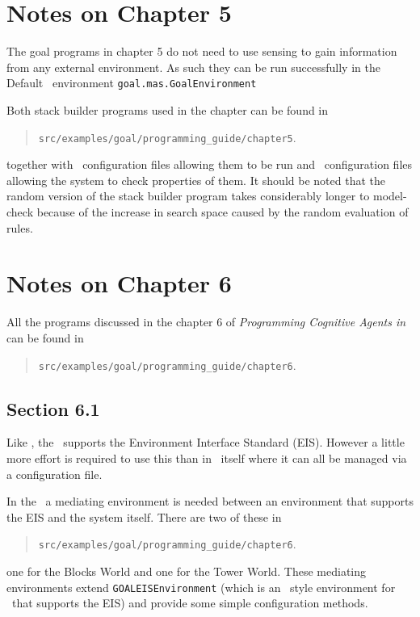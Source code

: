 \section{Notes on Chapter 5}
The goal programs in chapter 5 do not need to use sensing to gain information from any external environment.  As such they can be run successfully in the Default \goal\ environment \texttt{goal.mas.GoalEnvironment}

Both stack builder programs used in the chapter can be found in
\begin{quote}
  \texttt{src/examples/goal/programming\_guide/chapter5}.
\end{quote}
together with \ail\ configuration files allowing them to be run and \ajpf\ configuration files allowing the system to check properties of them.  It should be noted that the random version of the stack builder program takes considerably longer to model-check because of the increase in search space caused by the random evaluation of rules.

\section{Notes on Chapter 6}

All the programs discussed in the chapter 6 of \emph{Programming Cognitive Agents in \goal} can be found in
\begin{quote}
  \texttt{src/examples/goal/programming\_guide/chapter6}.
\end{quote}

\subsection{Section 6.1}
Like \goal, the \ail\ supports the Environment Interface Standard (EIS).  However a little more effort is required to use this than in \goal\ itself where it can all be managed via a configuration file.

In the \ail\ a mediating environment is needed between an environment that supports the EIS and the system itself.  There are two of these in 
\begin{quote}
  \texttt{src/examples/goal/programming\_guide/chapter6}.
\end{quote}
one for the Blocks World and one for the Tower World.  These mediating environments extend \texttt{GOALEISEnvironment} (which is an \ail\ style environment for \goal\ that supports the EIS) and provide some simple configuration methods.

